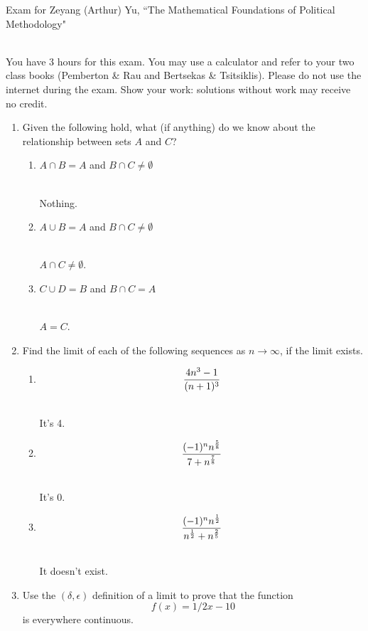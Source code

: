 \documentclass[11pt]{article}
\begin{document}
\noindent \large Exam for Zeyang (Arthur) Yu, ``The Mathematical Foundations of Political Methodology"

\normalsize
\ \\You have 3 hours for this exam.  You may use a calculator and refer to your two class books (Pemberton \& Rau  and Bertsekas \& Tsitsiklis).  Please do not use the internet during the exam.  Show your work: solutions without work may receive no credit.

\begin{enumerate}

\item Given the following hold, what (if anything) do we know about the relationship between sets $A$ and $C$?

\begin{enumerate}
\item $A\cap B= A$ and $B\cap C\not=\emptyset$

\ \\ Nothing.
\item $A\cup B= A$ and $B\cap C\not=\emptyset$

\ \\ $A\cap C\not=\emptyset$.
\item $C \cup D=B$ and $B\cap C=A$

\ \\ $A = C$.

\end{enumerate}

\vspace{.2in}

\item Find the limit of each of the following sequences as $n\rightarrow \infty$, if the limit exists.
\begin{enumerate}
\item $${{4n^3-1}\over{(n+1)^3}}$$

\ \\It's 4.
\item $${{(-1)^n n^{5\over 8}}\over{7+n^{7\over 8}}}$$

\ \\ It's 0.
\item $${{(-1)^n n^{1\over 2}}\over{n^{1\over 2}+n^{2\over 5}}}$$

\ \\ It doesn't exist.
\end{enumerate}

\vspace{.2in}

\item Use the $(\delta, \epsilon)$ definition of a limit to prove that the function $$f(x)={1/2}x-10$$ is everywhere continuous.


\end{enumerate}
\end{document}
